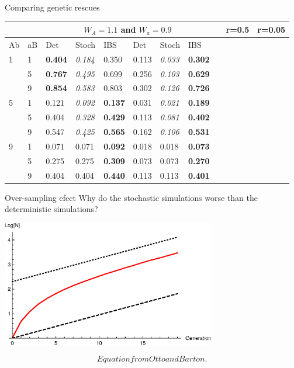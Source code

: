 \documentclass{beamer}
\begin{document}
\begin{frame}{Comparing genetic rescues}

\begin{tabular}{l | l | lll | lll}
&  & \multicolumn{6}{c}{$W_A=1.1$ and $W_a = 0.9$}
&  & \multicolumn{3}{c}{r=0.5} & \multicolumn{3}{c}{r=0.05} \\
\midrule
Ab& aB & Det & Stoch & IBS & Det & Stoch & IBS \\
\midrule
1 & 1 & \textbf{0.404} &\textit{0.184}& 0.350         & 0.113 & \textit{0.033} & \textbf{0.302} \\
     & 5 & \textbf{0.767} & \textit{0.495} & 0.699   & 0.256 & \textit{0.103} & \textbf{0.629}  \\
     & 9 & \textbf{0.854} & \textit{0.583} & 0.803   & 0.302 & \textit{0.126} &  \textbf{0.726}\\
     \midrule
5 & 1 & 0.121 & \textit{0.092} &  \textbf{0.137}         & 0.031 & \textit{0.021} & \textbf{0.189} \\
     & 5 & 0.404 & \textit{0.328} & \textbf{0.429}       & 0.113 & \textit{0.081} & \textbf{0.402}\\
     & 9 & 0.547 & \textit{0.425} & \textbf{0.565}    & 0.162 & \textit{0.106} & \textbf{0.531} \\
     \midrule
9 & 1 & 0.071 & 0.071 & \textbf{0.092}         & 0.018 & 0.018 & \textbf{0.073}\\
     & 5 & 0.275 & 0.275 & \textbf{0.309}  & 0.073 & 0.073 & \textbf{0.270}  \\
     & 9 & 0.404 & 0.404 & \textbf{0.440}   & 0.113 & 0.113 & \textbf{0.401} \\
\end{tabular}
\end{frame}

\begin{frame}{Over-sampling efect}
    Why do the stochastic simulations worse than the deterministic simulations?
    \vfill

\includegraphics[width=0.7\textwidth]{Rfiles/figures/PlotSimGrowth.eps}

\begin{equation*}
    Equation from Otto and Barton.
\end{equation*}
    
\end{frame}
\end{document}
